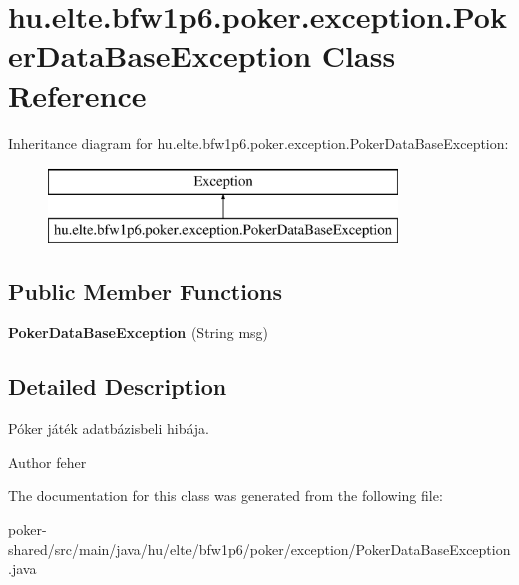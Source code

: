 \hypertarget{classhu_1_1elte_1_1bfw1p6_1_1poker_1_1exception_1_1_poker_data_base_exception}{}\section{hu.\+elte.\+bfw1p6.\+poker.\+exception.\+Poker\+Data\+Base\+Exception Class Reference}
\label{classhu_1_1elte_1_1bfw1p6_1_1poker_1_1exception_1_1_poker_data_base_exception}
Inheritance diagram for hu.\+elte.\+bfw1p6.\+poker.\+exception.\+Poker\+Data\+Base\+Exception\+:\begin{figure}[H]
\begin{center}
\leavevmode
\includegraphics[height=2.000000cm]{classhu_1_1elte_1_1bfw1p6_1_1poker_1_1exception_1_1_poker_data_base_exception}
\end{center}
\end{figure}
\subsection*{Public Member Functions}
\begin{DoxyCompactItemize}
\item 
\hypertarget{classhu_1_1elte_1_1bfw1p6_1_1poker_1_1exception_1_1_poker_data_base_exception_a2f4c66fd80e3445b3845bbac92e892e6}{}{\bfseries Poker\+Data\+Base\+Exception} (String msg)\label{classhu_1_1elte_1_1bfw1p6_1_1poker_1_1exception_1_1_poker_data_base_exception_a2f4c66fd80e3445b3845bbac92e892e6}

\end{DoxyCompactItemize}


\subsection{Detailed Description}
Póker játék adatbázisbeli hibája. \begin{DoxyAuthor}{Author}
feher 
\end{DoxyAuthor}


The documentation for this class was generated from the following file\+:\begin{DoxyCompactItemize}
\item 
poker-\/shared/src/main/java/hu/elte/bfw1p6/poker/exception/Poker\+Data\+Base\+Exception.\+java\end{DoxyCompactItemize}
